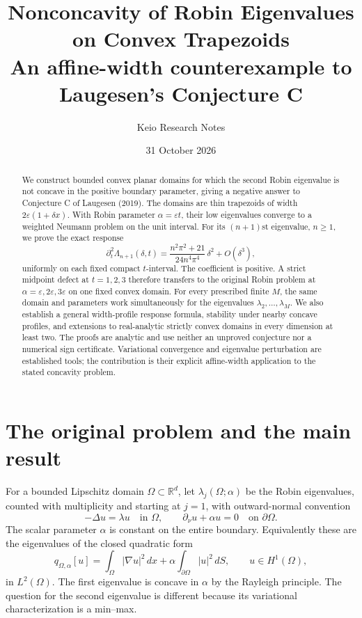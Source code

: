 \documentclass[11pt,a4paper]{article}
\title{Nonconcavity of Robin Eigenvalues\\on Convex Trapezoids\\[5pt]
\large An affine-width counterexample to Laugesen's Conjecture C}
\author{Keio Research Notes}
\date{31 October 2026}
\theoremstyle{definition}\newtheorem{definition}[theorem]{Definition}
\theoremstyle{remark}\newtheorem{remark}[theorem]{Remark}
\newcommand{\R}{\mathbb R}
\begin{document}
\maketitle
\begin{abstract}
We construct bounded convex planar domains for which the second
Robin eigenvalue is not concave in the positive boundary parameter,
giving a negative answer to Conjecture C of Laugesen (2019).
The domains are thin trapezoids of width $2\varepsilon(1+\delta x)$.
With Robin parameter $\alpha=\varepsilon t$, their low eigenvalues
converge to a weighted Neumann problem on the unit interval.
For its $(n+1)$st eigenvalue, $n\geq1$, we prove the exact response
\[
 \partial_t^2\Lambda_{n+1}(\delta,t)
 =\frac{n^2\pi^2+21}{24n^4\pi^4}\,\delta^2+O(\delta^3),
\]
uniformly on each fixed compact $t$-interval. The coefficient is
positive. A strict midpoint defect at $t=1,2,3$ therefore transfers
to the original Robin problem at $\alpha=\varepsilon,2\varepsilon,
3\varepsilon$ on one fixed convex domain. For every prescribed
finite $M$, the same domain and parameters work simultaneously for
the eigenvalues $\lambda_2,\ldots,\lambda_M$. We also establish a
general width-profile response formula, stability under nearby
concave profiles, and extensions to real-analytic strictly convex domains in every
dimension at least two. The proofs are
analytic and use neither an unproved conjecture nor a numerical
sign certificate. Variational convergence and eigenvalue
perturbation are established tools; the contribution is their
explicit affine-width application to the stated concavity problem.
\end{abstract}

\section{The original problem and the main result}
\label{sec:introduction}

For a bounded Lipschitz domain $\Omega\subset\R^d$, let
$\lambda_j(\Omega;\alpha)$ be the Robin eigenvalues, counted with
multiplicity and starting at $j=1$, with outward-normal convention
\begin{equation}\label{eq:robin-problem}
 -\Delta u=\lambda u\quad\text{in }\Omega,
 \qquad \partial_\nu u+\alpha u=0\quad\text{on }\partial\Omega.
\end{equation}
The scalar parameter $\alpha$ is constant on the entire boundary.
Equivalently these are the eigenvalues of the closed quadratic form
\begin{equation}\label{eq:robin-form}
 q_{\Omega,\alpha}[u]
 =\int_\Omega|\nabla u|^2\,dx
       +\alpha\int_{\partial\Omega}|u|^2\,dS,
 \qquad u\in H^1(\Omega),
\end{equation}
in $L^2(\Omega)$. The first eigenvalue is concave in $\alpha$ by
the Rayleigh principle. The question for the second eigenvalue is
different because its variational characterization is a min--max.
\end{document}
